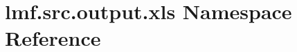\hypertarget{namespacelmf_1_1src_1_1output_1_1xls}{\section{lmf.\+src.\+output.\+xls Namespace Reference}
\label{namespacelmf_1_1src_1_1output_1_1xls}
}
